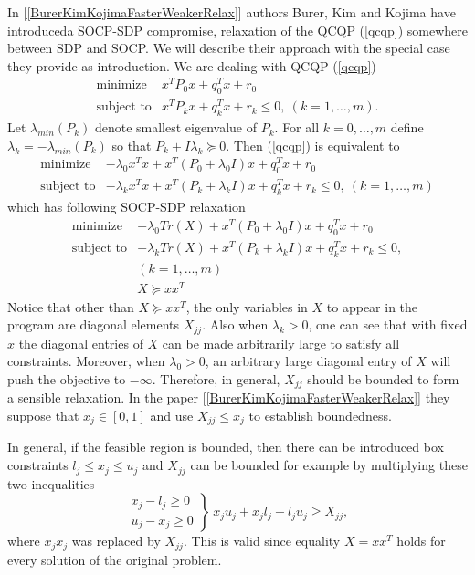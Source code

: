 \documentclass[12pt]{book}
\theoremstyle{definition}
\begin{document}
In [\ref{BurerKimKojimaFasterWeakerRelax}] authors Burer, Kim and Kojima have introduceda SOCP-SDP compromise, relaxation of the QCQP (\ref{qcqp}) somewhere between SDP and SOCP. We will describe their approach with the special case they provide as introduction.
We are dealing with QCQP (\ref{qcqp})
\begin{equation*}
\begin{array}{ll}
\mbox{minimize}& x^TP_0x + q_0^Tx + r_0 \\
\mbox{subject to}& x^TP_kx + q_k^Tx + r_k \leq 0, \  (k = 1,\dots ,m).
\end{array} 
\end{equation*}
Let  $\lambda_{min}(P_k)$ denote smallest eigenvalue of $P_k$.
For all $k=0,\dots ,m$ define $\lambda_k=-\lambda_{min}(P_k)$ so that $P_k + I\lambda_k\succeq 0$. Then (\ref{qcqp}) is equivalent to 
\begin{equation*}
\begin{array}{ll}
\mbox{minimize}& -\lambda_0 x^Tx +  x^T(P_0+\lambda_0 I)x + q_0^Tx + r_0\\
\mbox{subject to}& -\lambda_kx^Tx +  x^T(P_k+\lambda_kI)x + q_k^Tx + r_k \leq 0, \  (k = 1,\dots ,m)
\end{array} 
\end{equation*}
which has following SOCP-SDP relaxation
\begin{equation}
\label{InBetweenSOCPSDP1}
\begin{array}{ll}
\mbox{minimize}& -\lambda_0 Tr(X) +  x^T(P_0+\lambda_0 I)x + q_0^Tx +r_0 \\
\mbox{subject to}& -\lambda_k Tr(X) +  x^T(P_k+\lambda_kI)x + q_k^Tx + r_k \leq 0, \\  
&(k = 1,\dots ,m) \\
& X\succeq xx^T
\end{array} 
\end{equation}
Notice that other than $X\succeq xx^T$, the only variables in $X$ to appear in the program are diagonal elements $X_{jj}$.
Also when $\lambda_k>0$, one can see that with fixed $x$ the diagonal entries of $X$ can be made arbitrarily large to satisfy all constraints. Moreover, when $\lambda_0>0$, an arbitrary large diagonal entry of $X$ will push the objective to $-\infty .$ Therefore, in general, $X_{jj}$ should be bounded to form a sensible relaxation. In the paper [\ref{BurerKimKojimaFasterWeakerRelax}] they suppose that $x_j\in [0,1]$ and use $X_{jj}\leq x_j$ to establish boundedness. 

\rem In general, if the feasible region is bounded, then there can be introduced box constraints $l_j\leq x_j \leq u_j$ and $X_{jj}$ can be bounded for example by multiplying these two inequalities 
\begin{equation*}
\left.\begin{array}{r}
x_j - l_j \geq 0\\
u_j - x_j \geq 0
\end{array}\right\rbrace \
x_ju_j + x_jl_j - l_ju_j \geq X_{jj},
\end{equation*} 
where $x_jx_j$ was replaced by $X_{jj}$. This is valid since equality $X = xx^T$ holds for every solution of the original problem. 
\medskip
\end{document}
